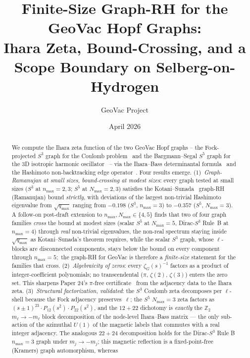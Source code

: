 \documentclass[11pt]{article}
\title{Finite-Size Graph-RH for the GeoVac Hopf Graphs:\\
Ihara Zeta, Bound-Crossing, and a Scope Boundary on Selberg-on-Hydrogen}
\author{GeoVac Project}
\date{April 2026}
\begin{document}
\maketitle

\begin{abstract}
We compute the Ihara zeta function of the two GeoVac Hopf graphs -- the
Fock-projected $S^3$ graph for the Coulomb problem~\cite{paper7} and the
Bargmann--Segal $S^5$ graph for the 3D isotropic harmonic
oscillator~\cite{paper24} -- via the Ihara--Bass determinantal
formula~\cite{ihara1966,bass1992} and the Hashimoto non-backtracking
edge operator~\cite{hashimoto1989}.  Four results emerge.
(1)~\emph{Graph-Ramanujan at small sizes, bound-crossing at modest
sizes}: every graph tested at small sizes
($S^3$ at $n_{\max}=2,3$; $S^5$ at $N_{\max}=2,3$) satisfies the
Kotani--Sunada~\cite{kotani2000} graph-RH (Ramanujan) bound
\emph{strictly}, with deviations of the largest non-trivial Hashimoto
eigenvalue from $\sqrt{q_{\max}}$ ranging from $-0.198$ ($S^3$,
$n_{\max}=3$) to $-0.357$ ($S^5$, $N_{\max}=3$).  A follow-on
post-draft extension to $n_{\max},N_{\max}\in\{4,5\}$ finds that two
of four graph families \emph{cross} the bound at modest
sizes (scalar $S^5$ at $N_{\max}=5$, Dirac-$S^3$ Rule~B at
$n_{\max}=4$) through \emph{real} non-trivial eigenvalues, the
non-real spectrum staying inside $\sqrt{q_{\max}}$ as Kotani--Sunada's
theorem requires, while the scalar $S^3$ graph, whose $\ell$-blocks are
disconnected components, stays below the bound on every component
through $n_{\max}=5$;\ the graph-RH for GeoVac is therefore a
\emph{finite-size} statement for the families that cross.
(2)~\emph{Algebraicity of zeros}:
every $\zeta_G(s)^{-1}$ factors as a product of integer-coefficient
polynomials; no transcendental ($\pi$, $\zeta(2)$, $\zeta(3)$) enters
the zero set.  This sharpens Paper 24's $\pi$-free
certificate~\cite{paper24} from the adjacency data to the Ihara zeta.
(3)~\emph{Structural factorization, validated}: the $S^3$ Coulomb zeta
decomposes per $\ell$-shell because the Fock adjacency preserves~$\ell$;
the $S^5$ $N_{\max}=3$ zeta factors as $(s\pm 1)^{23}\cdot
P_{12}(s^2)\cdot P_{22}(s^2)$, and the $12+22$ dichotomy is \emph{exactly}
the $\mathbb{Z}_2$ $m_\ell\to-m_\ell$ block decomposition of the
node-level Ihara--Bass matrix --- the only sub-action of the
azimuthal $U(1)$ of the magnetic labels that commutes with a real integer
adjacency.  The analogous $22+24$ decomposition holds for the
Dirac-$S^3$ Rule B $n_{\max}=3$ graph under $m_j\to-m_j$; this magnetic
reflection is a fixed-point-free (Kramers) graph automorphism, whereas

\end{abstract}
\end{document}
